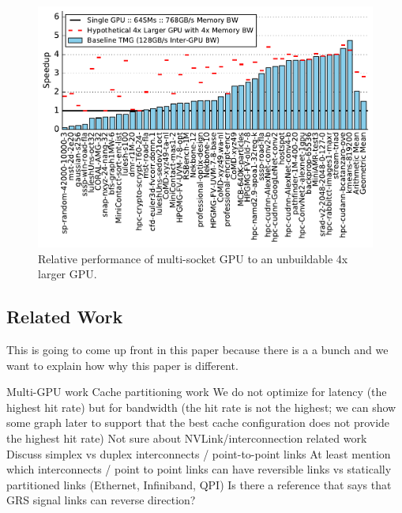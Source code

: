 \begin{figure}[tp]
    \centering
    \includegraphics[width=1\linewidth]{figures/plot_scalability_baseline.pdf}
    \caption{Relative performance of multi-socket GPU to an unbuildable 4x larger GPU.}
    \label{fig:motivation2}
\end{figure}

\subsection{Related Work}

This is going to come up front in this paper because there is a a bunch and we want to explain how
why this paper is different.

Multi-GPU work
Cache partitioning work
We do not optimize for latency (the highest hit rate) but for bandwidth (the hit rate is not the highest; we can show some graph later to support that the best cache configuration does not provide the highest hit rate)
Not sure about NVLink/interconnection related work
Discuss simplex vs duplex interconnects / point-to-point links
At least mention which interconnects / point to point links can have reversible links vs statically partitioned links (Ethernet, Infiniband, QPI)
Is there a reference that says that GRS signal links can reverse direction?


